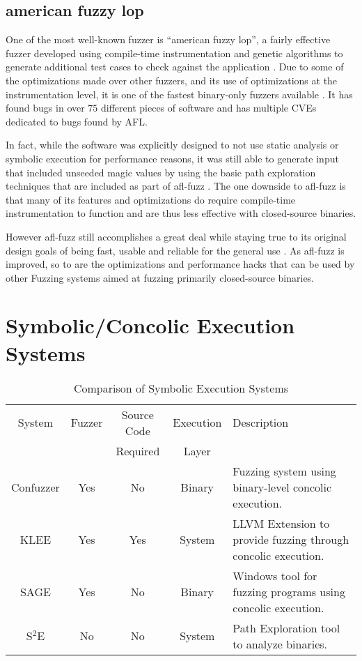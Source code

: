 \subsection{american fuzzy lop}
One of the most well-known fuzzer is ``american fuzzy lop'', a fairly effective
fuzzer developed using compile-time instrumentation and genetic algorithms to
generate additional test cases to check against the application \cite{afl}. Due
to some of the optimizations made over other fuzzers, and its use of
optimizations at the instrumentation level, it is one of the fastest binary-only
fuzzers available \cite{afldesign}. It has found bugs in over $75$ different
pieces of software and has multiple CVEs dedicated to bugs found by AFL.

In fact, while the software was explicitly designed to not use static analysis
or symbolic execution for performance reasons, it was still able to generate
input that included unseeded magic values by using the basic path exploration
techniques that are included as part of afl-fuzz \cite{aflsymbol}. The one
downside to afl-fuzz is that many of its features and optimizations do require
compile-time instrumentation to function and are thus less effective with
closed-source binaries.

However afl-fuzz still accomplishes a great deal while staying true to its
original design goals of being fast, usable and reliable for the general use
\cite{aflhistory}. As afl-fuzz is improved, so to are the optimizations and
performance hacks that can be used by other Fuzzing systems aimed at fuzzing
primarily closed-source binaries.

\section{Symbolic/Concolic Execution Systems}
\begin{table}
\begin{tabular}{| c | c | c | c | p{6cm} |}
\hline
System & Fuzzer & Source Code & Execution & Description\\
& & Required & Layer &\\\hline
Confuzzer & Yes & No & Binary & Fuzzing system using binary-level concolic execution.\\
KLEE & Yes & Yes & System & LLVM Extension to provide fuzzing through concolic
execution.\\
SAGE & Yes & No & Binary & Windows tool for fuzzing programs using concolic
execution.\\
S$^2$E & No & No & System & Path Exploration tool to analyze binaries.\\
\hline
\end{tabular}
\caption{Comparison of Symbolic Execution Systems}
\label{table:othersys}
\end{table}

